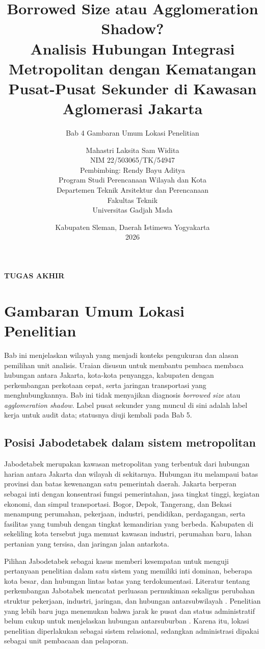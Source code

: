 \documentclass[11pt,a4paper,oneside,openany,indonesian]{report}
\title{\textbf{Borrowed Size atau Agglomeration Shadow?}\\[0.4em]
Analisis Hubungan Integrasi Metropolitan dengan Kematangan Pusat-Pusat Sekunder di Kawasan Aglomerasi Jakarta}
\subtitle{Bab 4 Gambaran Umum Lokasi Penelitian}
\author{Mahastri Laksita Sam Widita\\NIM 22/503065/TK/54947\\[0.5em]
Pembimbing: Rendy Bayu Aditya\\[0.5em]
Program Studi Perencanaan Wilayah dan Kota\\
Departemen Teknik Arsitektur dan Perencanaan\\
Fakultas Teknik\\
Universitas Gadjah Mada}
\date{Kabupaten Sleman, Daerah Istimewa Yogyakarta\\2026}
\makeatletter
\renewcommand{\maketitle}{%
  \begin{titlepage}
    \centering
    {\Large\bfseries TUGAS AKHIR\par}
    \vfill
    {\LARGE\bfseries \@title\par}
    \vspace{1.2cm}
    {\large \thesubtitle\par}
    \vfill
    {\large \@author\par}
    \vfill
    {\large \@date\par}
  \end{titlepage}}
\makeatother
\begin{document}
\maketitle
\tableofcontents
\clearpage
\setcounter{chapter}{3}
\chapter{Gambaran Umum Lokasi Penelitian}

Bab ini menjelaskan wilayah yang menjadi konteks pengukuran dan alasan pemilihan unit analisis. Uraian disusun untuk membantu pembaca membaca hubungan antara Jakarta, kota-kota penyangga, kabupaten dengan perkembangan perkotaan cepat, serta jaringan transportasi yang menghubungkannya. Bab ini tidak menyajikan diagnosis \emph{borrowed size} atau \emph{agglomeration shadow}. Label pusat sekunder yang muncul di sini adalah label kerja untuk audit data; statusnya diuji kembali pada Bab 5.

\section{Posisi Jabodetabek dalam sistem metropolitan}

Jabodetabek merupakan kawasan metropolitan yang terbentuk dari hubungan harian antara Jakarta dan wilayah di sekitarnya. Hubungan itu melampaui batas provinsi dan batas kewenangan satu pemerintah daerah. Jakarta berperan sebagai inti dengan konsentrasi fungsi pemerintahan, jasa tingkat tinggi, kegiatan ekonomi, dan simpul transportasi. Bogor, Depok, Tangerang, dan Bekasi menampung perumahan, pekerjaan, industri, pendidikan, perdagangan, serta fasilitas yang tumbuh dengan tingkat kemandirian yang berbeda. Kabupaten di sekeliling kota tersebut juga memuat kawasan industri, perumahan baru, lahan pertanian yang tersisa, dan jaringan jalan antarkota.

Pilihan Jabodetabek sebagai kasus memberi kesempatan untuk menguji pertanyaan penelitian dalam satu sistem yang memiliki inti dominan, beberapa kota besar, dan hubungan lintas batas yang terdokumentasi. Literatur tentang perkembangan Jabotabek mencatat perluasan permukiman sekaligus perubahan struktur pekerjaan, industri, jaringan, dan hubungan antarsubwilayah \parencite{henderson1996,hudalahfirman2012,hudalahetal2013}. Penelitian yang lebih baru juga menemukan bahwa jarak ke pusat dan status administratif belum cukup untuk menjelaskan hubungan antarsuburban \parencite{sadewoetal2023,aritenang2023}. Karena itu, lokasi penelitian diperlakukan sebagai sistem relasional, sedangkan administrasi dipakai sebagai unit pembacaan dan pelaporan.
\end{document}
